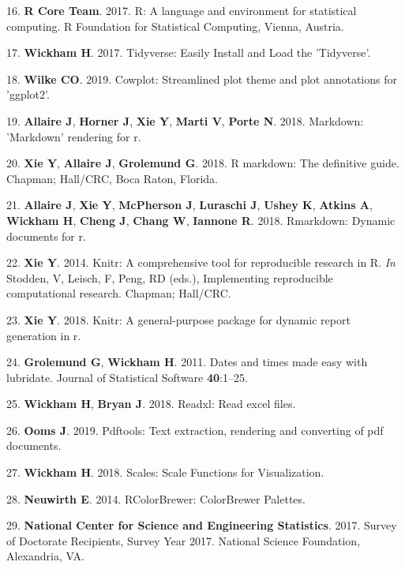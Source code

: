 \documentclass[10pt,]{article}
\begin{document}
\hypertarget{ref-R_software_2017}{}
16. \textbf{R Core Team}. 2017. R: A language and environment for
statistical computing. R Foundation for Statistical Computing, Vienna,
Austria.

\hypertarget{ref-wickham_tidyverse_2017}{}
17. \textbf{Wickham H}. 2017. Tidyverse: Easily Install and Load the
'Tidyverse'.

\hypertarget{ref-cowplot}{}
18. \textbf{Wilke CO}. 2019. Cowplot: Streamlined plot theme and plot
annotations for 'ggplot2'.

\hypertarget{ref-markdown}{}
19. \textbf{Allaire J}, \textbf{Horner J}, \textbf{Xie Y}, \textbf{Marti
V}, \textbf{Porte N}. 2018. Markdown: 'Markdown' rendering for r.

\hypertarget{ref-rmd_book}{}
20. \textbf{Xie Y}, \textbf{Allaire J}, \textbf{Grolemund G}. 2018. R
markdown: The definitive guide. Chapman; Hall/CRC, Boca Raton, Florida.

\hypertarget{ref-rmd_rstudio}{}
21. \textbf{Allaire J}, \textbf{Xie Y}, \textbf{McPherson J},
\textbf{Luraschi J}, \textbf{Ushey K}, \textbf{Atkins A},
\textbf{Wickham H}, \textbf{Cheng J}, \textbf{Chang W}, \textbf{Iannone
R}. 2018. Rmarkdown: Dynamic documents for r.

\hypertarget{ref-knitr_2014}{}
22. \textbf{Xie Y}. 2014. Knitr: A comprehensive tool for reproducible
research in R. \emph{In} Stodden, V, Leisch, F, Peng, RD (eds.),
Implementing reproducible computational research. Chapman; Hall/CRC.

\hypertarget{ref-knitr_2018}{}
23. \textbf{Xie Y}. 2018. Knitr: A general-purpose package for dynamic
report generation in r.

\hypertarget{ref-lubridate}{}
24. \textbf{Grolemund G}, \textbf{Wickham H}. 2011. Dates and times made
easy with lubridate. Journal of Statistical Software \textbf{40}:1--25.

\hypertarget{ref-readxl}{}
25. \textbf{Wickham H}, \textbf{Bryan J}. 2018. Readxl: Read excel
files.

\hypertarget{ref-pdftools}{}
26. \textbf{Ooms J}. 2019. Pdftools: Text extraction, rendering and
converting of pdf documents.

\hypertarget{ref-wickham_scales_2018}{}
27. \textbf{Wickham H}. 2018. Scales: Scale Functions for Visualization.

\hypertarget{ref-neuwirth_rcolorbrewer_2014}{}
28. \textbf{Neuwirth E}. 2014. RColorBrewer: ColorBrewer Palettes.

\hypertarget{ref-nsf_survey_2017}{}
29. \textbf{National Center for Science and Engineering Statistics}.
2017. Survey of Doctorate Recipients, Survey Year 2017. National Science
Foundation, Alexandria, VA.
\end{document}
